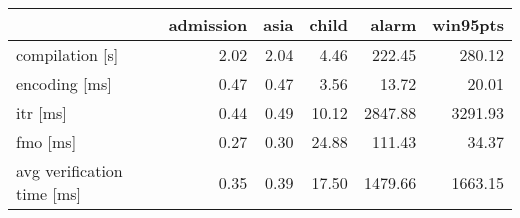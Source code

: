 \begin{tabular}{lrrrrr}
\toprule
 & admission & asia & child & alarm & win95pts \\
\midrule
compilation [s] & 2.02 & 2.04 & 4.46 & 222.45 & 280.12 \\
encoding [ms] & 0.47 & 0.47 & 3.56 & 13.72 & 20.01 \\
itr [ms] & 0.44 & 0.49 & 10.12 & 2847.88 & 3291.93 \\
fmo [ms] & 0.27 & 0.30 & 24.88 & 111.43 & 34.37 \\
avg verification time [ms] & 0.35 & 0.39 & 17.50 & 1479.66 & 1663.15 \\
\bottomrule
\end{tabular}
